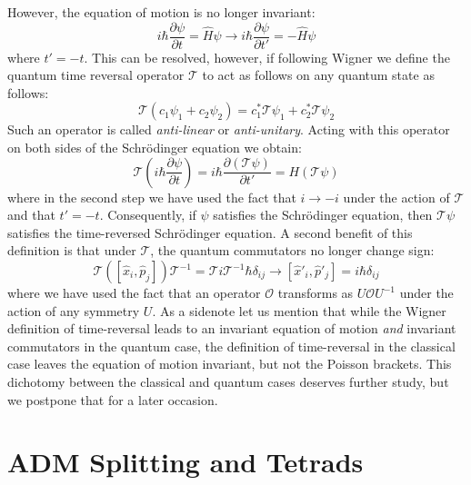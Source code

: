 \documentclass[preprint]{SciPost}
\newcommand{\mc}[1]{\mathcal{#1}}
\theoremstyle{plain} %
\begin{document}
However, the equation of motion is no longer invariant:
\begin{equation}\label{eqn:trs-schrodinger}
i \hbar \frac{\partial \psi}{\partial t} =  \hat{H} \psi \rightarrow i \hbar \frac{\partial \psi}{\partial t'} =  - \hat{H} \psi
\end{equation}
where $ t' = -t $. This can be resolved, however, if following Wigner we define the quantum time reversal operator $ \mc{T} $ to act as follows on any quantum state as follows:
\begin{equation}\label{eqn:wigner-time-reversal}
\mc{T} ( c_1 \psi_1 + c_2 \psi_2 ) = c_1^* \mc{T} \psi_1 + c_2^* \mc{T} \psi_2
\end{equation}
Such an operator is called \emph{anti-linear} or \emph{anti-unitary}. Acting with this operator on both sides of the Schr\"{o}dinger equation we obtain:
\begin{equation}\label{eqn:trs-schrodinger-2}
\mc{T} \left( i \hbar \frac{\partial \psi}{\partial t} \right) = i \hbar \frac{\partial (\mc{T} \psi)}{\partial t'} = H (\mc{T} \psi)
\end{equation}
where in the second step we have used the fact that $ i \rightarrow -i $ under the action of $ \mc{T} $ and that $ t' = -t $. Consequently, if $ \psi $ satisfies the Schr\"{o}dinger equation, then $ \mc{T} \psi $ satisfies the time-reversed Schr\"{o}dinger equation. A second benefit of this definition is that under $ \mc{T} $, the quantum commutators no longer change sign:
\begin{equation}\label{eqn:quantum-poisson-2}
\mc{T} \left(\left[ \hat{x}_i, \hat{p}_j \right]\right) \mc{T}^{-1} = \mc{T} i \mc{T}^{-1} \hbar \delta_{ij} \rightarrow \left[\hat{x}'_i, \hat{p}'_j \right]= i \hbar \delta_{ij}
\end{equation}
where we have used the fact that an operator $ \mc{O} $ transforms as $ U \mc{O} U^{-1} $ under the action of any symmetry $ U $. As a sidenote let us mention that while the Wigner definition of time-reversal leads to an invariant equation of motion \emph{and} invariant commutators in the quantum case, the definition of time-reversal in the classical case leaves the equation of motion invariant, but not the Poisson brackets. This dichotomy between the classical and quantum cases deserves further study, but we postpone that for a later occasion.

\section{ADM Splitting and Tetrads}\label{sec:adm-tetrad}
\end{document}
